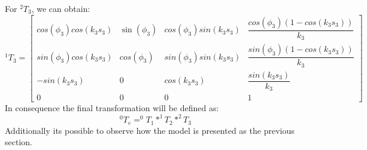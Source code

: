 \documentclass[12pt, twoside]{report}
\begin{document}
For $^2 T_3$, we can obtain:\\
\begin{equation}
    ^1 T_3=\begin{bmatrix}
        cos(\phi_3)cos(k_3 s_3 ) & \sin(\phi_3) &cos(\phi_3) sin(k_3 s_3)& \dfrac{cos(\phi_3)(1-cos(k_3 s_3))}{k_3}\\
        
        sin(\phi_3)cos(k_3 s_3) & cos(\phi_3) & sin(\phi_3)sin(k_3 s_3) &  \dfrac{sin(\phi_3)(1-cos(k_3 s_3))}{k_3}\\
        -sin(k_3 s_3) & 0 & cos(k_3 s_3) & \dfrac{sin(k_3 s_3)}{k_3}\\
        0 & 0 & 0 & 1
    \end{bmatrix}
    \label{eq:homogen1}
\end{equation}
In consequence the final transformation will be defined as:\\

\begin{equation}
    ^0 T_e=^{0} T_{1} * ^{1} T_{2} * ^{2} T_{3}
\end{equation}
Additionally its possible to observe how the model is presented as the previous section.
\end{document}
